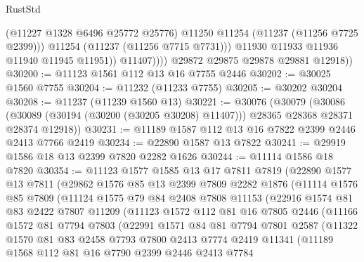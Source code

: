 \begin{lexlean}{RustStd}
\begin{coremodule}
                        (@11227 @1328 @6496 @25772 @25776)
                        @11250
                        @11254
                        (@11237 (@11256 @7725 @2399)))
                      @11254
                      (@11237 (@11256 @7715 @7731)))
                    @11930
                    @11933
                    @11936
                    @11940
                    @11945
                    @11951))
                @11407))))
        @29872
        @29875
        @29878
        @29881
        @12918))
@30200 := @11123 @1561 @112 @13 @16 @7755 @2446
@30202 := @30025 @1560 @7755
@30204 := @11232 (@11233 @7755)
@30205 := @30202 @30204
@30208 := @11237 (@11239 @1560 @13)
@30221 := @30076
    (@30079
      (@30086 (@30089 (@30194 (@30200 (@30205 @30208) @11407))) @28365 @28368 @28371 @28374 @12918))
@30231 := @11189 @1587 @112 @13 @16 @7822 @2399 @2446 @2413 @7766 @2419
@30234 := @22890 @1587 @13 @7822
@30241 := @29919 @1586 @18 @13 @2399 @7820 @2282 @1626
@30244 := @11114 @1586 @18 @7820
@30354 := @11123
    @1577
    @1585
    @13
    @17
    @7811
    @7819
    (@22890
      @1577
      @13
      @7811
      (@29862
        @1576
        @85
        @13
        @2399
        @7809
        @2282
        @1876
        (@11114
          @1576
          @85
          @7809
          (@11124
            @1575
            @79
            @84
            @2408
            @7808
            @11153
            (@22916
              @1574
              @81
              @83
              @2422
              @7807
              @11209
              (@11123
                @1572
                @112
                @81
                @16
                @7805
                @2446
                (@11166
                  @1572
                  @81
                  @7794
                  @7803
                  (@22991
                    @1571
                    @84
                    @81
                    @7794
                    @7801
                    @2587
                    (@11322
                      @1570
                      @81
                      @83
                      @2458
                      @7793
                      @7800
                      @2413
                      @7774
                      @2419
                      @11341
                      (@11189
                        @1568
                        @112
                        @81
                        @16
                        @7790
                        @2399
                        @2446
                        @2413
                        @7784

\end{coremodule}
\end{lexlean}

